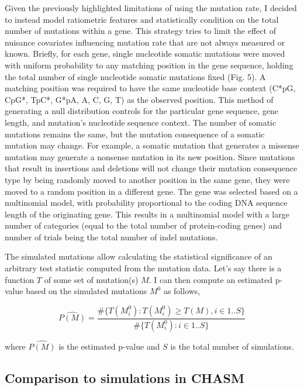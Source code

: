 Given the previously highlighted limitations of using the mutation rate, I decided to instead model ratiometric features and statistically condition on the total number of mutations within a gene. This strategy tries to limit the effect of nuisance covariates influencing mutation rate that are not always measured or known. Briefly, for each gene, single nucleotide somatic mutations were moved with uniform probability to any matching position in the gene sequence, holding the total number of single nucleotide somatic mutations fixed (Fig. 5). A matching position was required to have the same nucleotide base context (C*pG, CpG*, TpC*, G*pA, A, C, G, T) as the observed position. This method of generating a null distribution controls for the particular gene sequence, gene length, and mutation's nucleotide sequence context. The number of somatic mutations remains the same, but the mutation consequence of a somatic mutation may change. For example, a somatic mutation that generates a missense mutation may generate a nonsense mutation in its new position. Since mutations that result in insertions and deletions will not change their mutation consequence type by being randomly moved to another position in the same gene, they were moved to a random position in a different gene. The gene was selected based on a multinomial model, with probability proportional to the coding DNA sequence length of the originating gene. This results in a multinomial model with a large number of categories (equal to the total number of protein-coding genes) and number of trials being the total number of indel mutations.

The simulated mutations allow calculating the statistical significance of an arbitrary test statistic computed from the mutation data. Let's say there is a function $T$ of some set of mutation(s) $M$. I can then compute an estimated p-value based on the simulated mutations $M^0$ as follows,

\begin{equation}
\widehat{P(M)} = \frac{\#\{T(M^0_i) : T(M^0_i) \geq T(M), i \in 1..S\}}{\#\{T(M^0_i) : i \in 1..S\}}
\end{equation}

where $\widehat{P(M)}$ is the estimated p-value and $S$ is the total number of simulations. 

\subsection{Comparison to simulations in CHASM}

